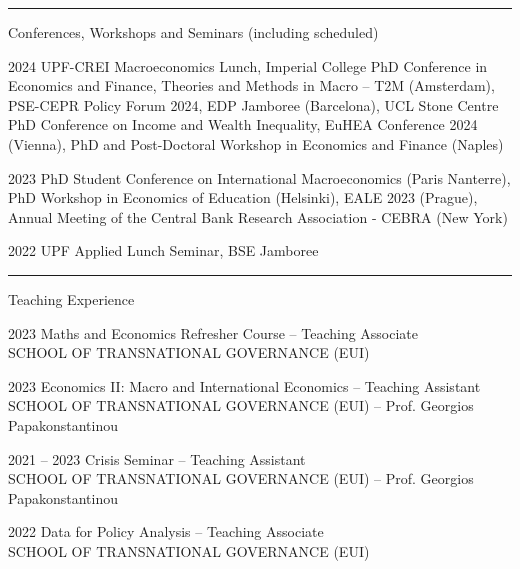 \documentclass[5pt,a4paper]{article}
\begin{document}
\begin{cv}{}
\hrule
 \begin{cvlist}{Conferences, Workshops and Seminars (including scheduled)}
    \item[\small 2024] \normalsize UPF-CREI Macroeconomics Lunch,  Imperial College PhD Conference in Economics and Finance,  Theories and Methods in Macro -- T2M (Amsterdam), PSE-CEPR Policy Forum 2024, EDP Jamboree (Barcelona), UCL Stone Centre PhD Conference on Income and Wealth Inequality, EuHEA Conference 2024 (Vienna),  PhD and Post-Doctoral Workshop in Economics and Finance (Naples)
   \item[\small 2023] \normalsize {} PhD Student Conference
on International Macroeconomics (Paris Nanterre), PhD Workshop in Economics of Education (Helsinki), EALE 2023 (Prague), Annual Meeting of the Central Bank Research Association - CEBRA (New York)
	\item[\small 2022] \normalsize UPF Applied Lunch Seminar, BSE Jamboree
  \end{cvlist}

  \hrule 
  \begin{cvlist}{Teaching Experience}
  \item[\small 2023] \normalsize Maths and Economics Refresher Course -- \small Teaching Associate \\ 
  \footnotesize SCHOOL OF TRANSNATIONAL GOVERNANCE (EUI)
    \item[\small 2023] \normalsize Economics II: Macro and International Economics -- \small Teaching Assistant\\
	    \footnotesize SCHOOL OF TRANSNATIONAL GOVERNANCE (EUI) -- Prof. Georgios Papakonstantinou \small  
        \item[\small 2021 -- 2023] \normalsize Crisis Seminar -- \small Teaching Assistant\\
	    \footnotesize SCHOOL OF TRANSNATIONAL GOVERNANCE (EUI) -- Prof. Georgios Papakonstantinou \small  
    \item[\small 2022] \normalsize Data for Policy Analysis -- \small Teaching Associate\\
    \footnotesize SCHOOL OF TRANSNATIONAL GOVERNANCE (EUI)%
\end{cvlist}




\end{cv}
\end{document}
